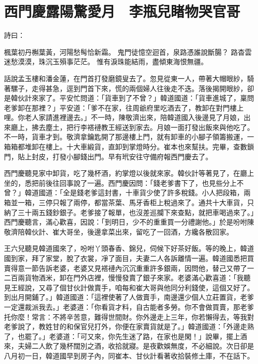 %

\chapter{西門慶露陽驚愛月　李瓶兒睹物哭官哥}


\begin{showcontents}{}


詩曰：

楓葉初丹槲葉黃，河陽愁髩恰新霜。
鬼門徒憶空迴首，泉路憑誰說斷腸？
路杳雲迷愁漠漠，珠沉玉殞事茫茫。
惟有淚珠能結雨，盡傾東海恨無疆。

話說孟玉樓和潘金蓮，在門首打發磨鏡叟去了。忽見從東一人，帶著大帽眼紗，騎著騾子，走得甚急，逕到門首下來，慌的兩個婦人往後走不迭。落後揭開眼紗，卻是韓伙計來家了。平安忙問道：「貨車到了不曾？」韓道國道：「貨車進城了，稟問老爹卸在那裡？」平安道：「爹不在家，往周爺府里吃酒去了，教卸在對門樓上哩。你老人家請進裡邊去。」不一時，陳敬濟出來，陪韓道國入後邊見了月娘，出來廳上，拂去塵土，把行李褡褳教王經送到家去。月娘一面打發出飯來與他吃了。不一時，貨車才到。敬濟拿鑰匙開了那邊樓上門，就有卸車的小腳子領籌搬運，一箱箱都堆卸在樓上。十大車緞貨，直卸到掌燈時分。崔本也來幫扶。完畢，查數鎖門，貼上封皮，打發小腳錢出門。早有玳安往守備府報西門慶去了。

西門慶聽見家中卸貨，吃了幾杯酒，約掌燈以後就來家。韓伙計等著見了，在廳上坐的，悉把前後往回事說了一遍。西門慶因問：「錢老爹書下了，也見些分上不曾？」韓道國道：「全是錢老爹這封書，十車貨少使了許多稅錢。小人把段箱，兩箱並一箱，三停只報了兩停，都當茶葉、馬牙香柜上稅過來了。通共十大車貨，只納了三十兩五錢鈔銀子。老爹接了報單，也沒差巡攔下來查點，就把車喝過來了。」西門慶聽言，滿心歡喜，因說：「到明日，少不的重重買一分禮謝他。」於是吩咐陳敬濟陪韓伙計、崔大哥坐，後邊拿菜出來，留吃了一回酒，方纔各散回家。

王六兒聽見韓道國來了，吩咐丫頭春香、錦兒，伺候下好茶好飯。等的晚上，韓道國到家，拜了家堂，脫了衣裳，凈了面目，夫妻二人各訴離情一遍。韓道國悉把買賣得意一節告訴老婆，老婆又見褡褳內沉沉重重許多銀兩，因問他，替己又帶了一二百兩貨物酒米，卸在門外店裡，慢慢發賣了銀子來家。老婆滿心歡喜道：「我聽見王經說，又尋了個甘伙計做賣手，咱每和崔大哥與他同分利錢使，這個又好了。到出月開鋪了。」韓道國道：「這裡使著了人做賣手，南邊還少個人立莊置貨，老爹一定還裁派我去。」老婆道：「你看貨才料，自古能者多勞。你不會做買賣，那老爹托你麼！常言：不將辛苦意，難得世間財。你外邊走上三年，你若懶得去，等我對老爹說了，教姓甘的和保官兒打外，你便在家賣貨就是了。」韓道國道：「外邊走熟了，也罷了。」老婆道：「可又來，你先生迷了路，在家也是閑！」說畢，擺上酒來，夫婦二人飲了幾杯闊別之酒，收拾就寢。是夜歡娛無度，不必細說。次日卻是八月初一日，韓道國早到房子內，同崔本、甘伙計看著收拾裝修土庫，不在話下。


\end{showcontents}
